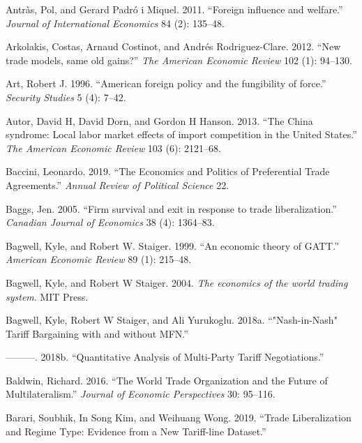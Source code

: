 \documentclass{puthesis}
\newlength{\cslhangindent}
\newenvironment{cslreferences}%
  {\setlength{\parindent}{0pt}%
  \everypar{\setlength{\hangindent}{\cslhangindent}}\ignorespaces}%
  {\par}
\begin{document}
\begin{cslreferences}
\leavevmode\hypertarget{ref-Antras2011}{}%
Antràs, Pol, and Gerard Padró i Miquel. 2011. ``Foreign influence and
welfare.'' \emph{Journal of International Economics} 84 (2): 135--48.

\leavevmode\hypertarget{ref-Arkolakis2012}{}%
Arkolakis, Costas, Arnaud Costinot, and Andrés Rodriguez-Clare. 2012.
``New trade models, same old gains?'' \emph{The American Economic
Review} 102 (1): 94--130.

\leavevmode\hypertarget{ref-Art1996}{}%
Art, Robert J. 1996. ``American foreign policy and the fungibility of
force.'' \emph{Security Studies} 5 (4): 7--42.

\leavevmode\hypertarget{ref-Autor2013}{}%
Autor, David H, David Dorn, and Gordon H Hanson. 2013. ``The China
syndrome: Local labor market effects of import competition in the United
States.'' \emph{The American Economic Review} 103 (6): 2121--68.

\leavevmode\hypertarget{ref-Baccini2019}{}%
Baccini, Leonardo. 2019. ``The Economics and Politics of Preferential
Trade Agreements.'' \emph{Annual Review of Political Science} 22.

\leavevmode\hypertarget{ref-Baggs2005}{}%
Baggs, Jen. 2005. ``Firm survival and exit in response to trade
liberalization.'' \emph{Canadian Journal of Economics} 38 (4): 1364--83.

\leavevmode\hypertarget{ref-Bagwell1999}{}%
Bagwell, Kyle, and Robert W. Staiger. 1999. ``An economic theory of
GATT.'' \emph{American Economic Review} 89 (1): 215--48.

\leavevmode\hypertarget{ref-Bagwell2004}{}%
Bagwell, Kyle, and Robert W Staiger. 2004. \emph{The economics of the
world trading system}. MIT Press.

\leavevmode\hypertarget{ref-Bagwell2018b}{}%
Bagwell, Kyle, Robert W Staiger, and Ali Yurukoglu. 2018a.
``"Nash-in-Nash" Tariff Bargaining with and without MFN.''

\leavevmode\hypertarget{ref-Bagwell2018a}{}%
---------. 2018b. ``Quantitative Analysis of Multi-Party Tariff
Negotiations.''

\leavevmode\hypertarget{ref-Baldwin2016}{}%
Baldwin, Richard. 2016. ``The World Trade Organization and the Future of
Multilateralism.'' \emph{Journal of Economic Perspectives} 30: 95--116.

\leavevmode\hypertarget{ref-Barari2019}{}%
Barari, Soubhik, In Song Kim, and Weihuang Wong. 2019. ``Trade
Liberalization and Regime Type: Evidence from a New Tariff-line
Dataset.''


\end{cslreferences}
\end{document}

